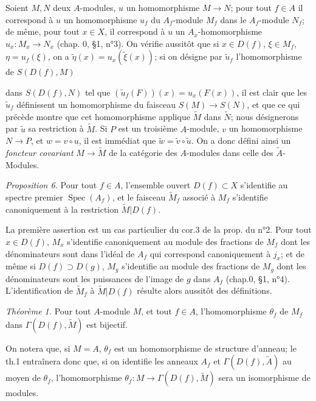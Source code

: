 Soient $M, N$ deux $A$-modules, $u$ un homomorphisme $M \to N$; pour tout $f \in A$ il correspond à $u$ un homomorphisme $u_f$ du $A_f$-module $M_f$ dans le $A_f$-module $N_f$; de même, pour tout $x \in X$, il correspond à $u$ un $A_x$-homomorphisme $u_x: M_x \to N_x$ (chap. 0, §1, n°3). On vérifie aussitôt que si $x \in D(f)$, $\xi \in M_f$, $\eta = u_f(\xi)$, on a $\tilde{\eta}(x) = u_x(\tilde{\xi}(x))$; si on désigne par $\tilde{u}_f$ l'homomorphisme de $S(D(f), M)$

\newpage


dans $S(D(f),N)$ tel que $(\tilde{u}_f(F))(x) = u_x(F(x))$, il est clair que les $\tilde{u}_f$ définissent un homomorphisme du faisceau $S(M) \to S(N)$, et que ce qui précède montre que cet homomorphisme applique $\tilde{M}$ dans $\tilde{N}$; nous désignerons par $\tilde{u}$ sa restriction à $\tilde{M}$. Si $P$ est un troisième $A$-module, $v$ un homomorphisme $N \to P$, et $w = v \circ u$, il est immédiat que $\tilde{w} = \tilde{v} \circ \tilde{u}$. On a donc défini ainsi un \emph{foncteur covariant} $M \to \tilde{M}$ de la catégorie des $A$-modules dans celle des $\tilde{A}$-Modules.

\emph{Proposition 6.} Pour tout $f \in A$, l'ensemble ouvert $D(f) \subset X$ s'identifie au spectre premier $\operatorname{Spec}(A_f)$, et le faisceau $\tilde{M}_f$ associé à $M_f$ s'identifie canoniquement à la restriction $\tilde{M}|D(f)$.

La première assertion est un cas particulier du cor.3 de la prop. du n°2. Pour tout $x \in D(f)$, $M_x$ s'identifie canoniquement au module des fractions de $M_f$ dont les dénominateurs sont dans l'idéal de $A_f$ qui correspond canoniquement à $j_x$; et de même si $D(f) \supset D(g)$, $M_g$ s'identifie au module des fractions de $M_g$ dont les dénominateurs sont les puissances de l'image de $g$ dans $A_f$ (chap.0, §1, n°4). L'identification de $\tilde{M}_f$ à $\tilde{M}|D(f)$ résulte alors aussitôt des définitions.

\emph{Théorème 1.} Pour tout $A$-module $M$, et tout $f \in A$, l'homomorphisme $\theta_f$ de $M_f$ dans $\Gamma(D(f), \tilde{M})$ est bijectif.

On notera que, si $M = A$, $\theta_f$ est un homomorphisme de structure d'anneau; le th.1 entraînera donc que, si on identifie les anneaux $A_f$ et $\Gamma(D(f), \tilde{A})$ au moyen de $\theta_f$, l'homomorphisme $\theta_f : M \to \Gamma(D(f), \tilde{M})$ sera un isomorphisme de modules.

